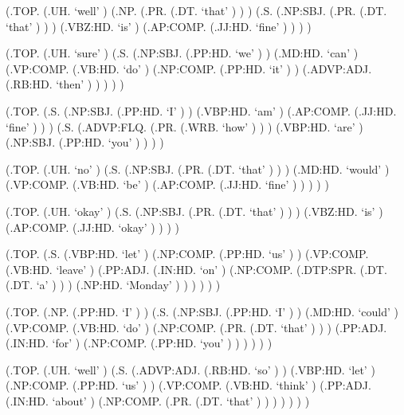 \documentclass[10pt]{article}
\begin{document}
\begin{parsetree}  (.TOP. (.UH. `well' ) (.NP. (.PR. (.DT. `that' ) ) ) (.S. (.NP:SBJ. (.PR. (.DT. `that' ) ) ) (.VBZ:HD. `is' ) (.AP:COMP. (.JJ:HD. `fine' ) ) ) ) \end{parsetree}

\begin{parsetree}  (.TOP. (.UH. `sure' ) (.S. (.NP:SBJ. (.PP:HD. `we' ) ) (.MD:HD. `can' ) (.VP:COMP. (.VB:HD. `do' ) (.NP:COMP. (.PP:HD. `it' ) ) (.ADVP:ADJ. (.RB:HD. `then' ) ) ) ) ) \end{parsetree}

\begin{parsetree}  (.TOP. (.S. (.NP:SBJ. (.PP:HD. `I' ) ) (.VBP:HD. `am' ) (.AP:COMP. (.JJ:HD. `fine' ) ) ) (.S. (.ADVP:FLQ. (.PR. (.WRB. `how' ) ) ) (.VBP:HD. `are' ) (.NP:SBJ. (.PP:HD. `you' ) ) ) ) \end{parsetree}

\begin{parsetree}  (.TOP. (.UH. `no' ) (.S. (.NP:SBJ. (.PR. (.DT. `that' ) ) ) (.MD:HD. `would' ) (.VP:COMP. (.VB:HD. `be' ) (.AP:COMP. (.JJ:HD. `fine' ) ) ) ) ) \end{parsetree}

\begin{parsetree}  (.TOP. (.UH. `okay' ) (.S. (.NP:SBJ. (.PR. (.DT. `that' ) ) ) (.VBZ:HD. `is' ) (.AP:COMP. (.JJ:HD. `okay' ) ) ) ) \end{parsetree}

\begin{parsetree}  (.TOP. (.S. (.VBP:HD. `let' ) (.NP:COMP. (.PP:HD. `us' ) ) (.VP:COMP. (.VB:HD. `leave' ) (.PP:ADJ. (.IN:HD. `on' ) (.NP:COMP. (.DTP:SPR. (.DT. (.DT. `a' ) ) ) (.NP:HD. `Monday' ) ) ) ) ) ) \end{parsetree}

\begin{parsetree}  (.TOP. (.NP. (.PP:HD. `I' ) ) (.S. (.NP:SBJ. (.PP:HD. `I' ) ) (.MD:HD. `could' ) (.VP:COMP. (.VB:HD. `do' ) (.NP:COMP. (.PR. (.DT. `that' ) ) ) (.PP:ADJ. (.IN:HD. `for' ) (.NP:COMP. (.PP:HD. `you' ) ) ) ) ) ) \end{parsetree}

\begin{parsetree}  (.TOP. (.UH. `well' ) (.S. (.ADVP:ADJ. (.RB:HD. `so' ) ) (.VBP:HD. `let' ) (.NP:COMP. (.PP:HD. `us' ) ) (.VP:COMP. (.VB:HD. `think' ) (.PP:ADJ. (.IN:HD. `about' ) (.NP:COMP. (.PR. (.DT. `that' ) ) ) ) ) ) ) \end{parsetree}
\end{document}
